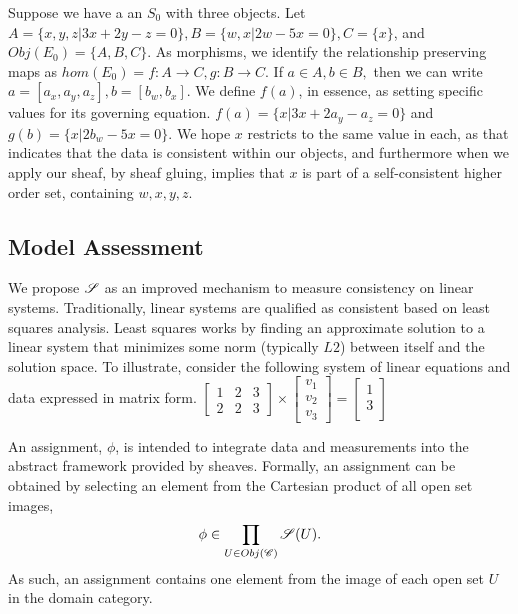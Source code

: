 \documentclass{article}
\begin{document}
\begin{example}
	Suppose we have a an $S_0$ with three objects.
	Let $A=\{x,y,z|3x + 2y -z = 0\}, B=\{w,x|2w-5x=0\}, C=\{x\}$, and $Obj(E_0) 
	= 
	\{A,B,C\}$. As morphisms, we identify the relationship preserving maps as 
	$hom(E_0) = f:A \to C,g:B \to C$. If $a\in A, b \in B,$ then we can write 
	$a=[a_x,a_y,a_z],b=[b_w,b_x]$. We define $f(a)$, in essence, as setting 
	specific values for its governing equation. $f(a) = \{x|3x +2a_y-a_z=0\}$ 
	and 
	$g(b)=\{x|2b_w-5x=0\}$. We hope $x$ restricts to the same value in each, as 
	that indicates that the data is consistent within our objects, and 
	furthermore when we apply our sheaf, by sheaf 
	gluing, implies that $x$ is part of a self-consistent higher order set, 
	containing $w,x,y,z$.

\end{example}

\subsection{Model Assessment}
We propose $\mathscr{S}$ as an improved mechanism to measure consistency on linear systems.
Traditionally, linear systems are qualified as consistent based on least
 squares analysis. Least squares works by finding an approximate
 solution to a linear system that minimizes some norm (typically $L2$)
 between itself and the solution space. To illustrate, consider the following
system of linear equations and data expressed in matrix form. 
$\begin{bmatrix}
1 & 2 & 3\\
2 & 2 & 3
\end{bmatrix} \times \begin{bmatrix}
v_1 \\
 v_2 \\
 v_3
\end{bmatrix} = \begin{bmatrix}
1 \\ 
 3\\
\end{bmatrix}$


An assignment, $\phi$, is intended to integrate data and measurements
into the abstract framework provided by sheaves. Formally, an assignment can be
obtained by selecting an element from the Cartesian product of all open set
images, 
\begin{equation}
\phi \in \prod_{U \in Obj(\mathscr{C})} \mathscr{S}(U) .
\end{equation}
As such, an assignment contains one element from the image of each open set $U$
in the domain category.
\end{document}
